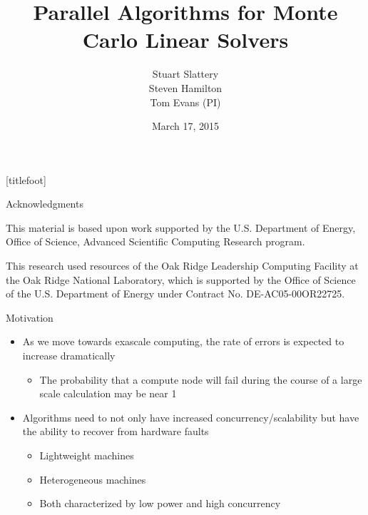 \documentclass{beamer}
\title[Parallel Monte Carlo Solvers]{Parallel Algorithms for Monte Carlo
  Linear Solvers}
\author[Slattery, Hamilton, Evans]{Stuart Slattery
  \\ Steven Hamilton \\ Tom Evans (PI) }
\date[3/17/15]{March 17, 2015}
\institute[ORNL]{\small Oak Ridge National Laboratory}
\begin{document}

{
[titlefoot]
\begin{frame}
\titlepage
\end{frame}
}

\begin{frame}{Acknowledgments}

  This material is based upon work supported by the U.S. Department of
  Energy, Office of Science, Advanced Scientific Computing Research
  program.

  \vfill

  This research used resources of the Oak Ridge Leadership Computing
  Facility at the Oak Ridge National Laboratory, which is supported by the
  Office of Science of the U.S. Department of Energy under Contract No.
  DE-AC05-00OR22725.

\end{frame}

\begin{frame}{Motivation}
  \vfill
\begin{itemize}
  \item As we move towards exascale computing, the rate of errors is expected
  to increase dramatically
  \vfill
  \begin{itemize}
  \item The probability that a compute node will fail during the course
    of a large scale calculation may be near 1
  \end{itemize}
  \vfill
\item Algorithms need to not only have increased concurrency/scalability
  but have the ability to recover from hardware faults
  \begin{itemize}
  \item Lightweight machines
  \item Heterogeneous machines
  \item Both characterized by low power and high concurrency
  \end{itemize}
  \vfill
\end{itemize}
\vfill
\end{frame}
\end{document}
